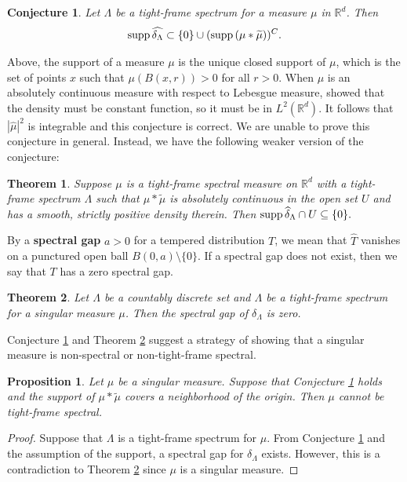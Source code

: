 \documentclass[12pt,a4paper,oneside]{amsart}
\newtheorem{theorem}{Theorem}
\newtheorem{conjecture}{Conjecture}
\newtheorem{proposition}{Proposition}
\theoremstyle{definition}
\newcommand{\Set}[1]{{\left\{{#1}\right\}}}
\newcommand{\RR}{{\mathbb R}}
\newcommand{\supp}{{\rm supp\,}}
\newcommand{\ft}[1]{\widehat{#1}}
\newcommand{\wt}[1]{\widetilde{#1}}
\newcounter{rem}
\begin{document}
\begin{conjecture}\label{conjecture1}
Let $\Lambda$ be a {tight-frame} spectrum for a measure $\mu$ in $\RR^d$. Then 
$$
\supp\ft{\delta_{\Lambda}} \subset \{0\}\cup (\supp (\mu\ast\wt{\mu}))^C. 
$$
\end{conjecture}
{Above}, the support of a measure $\mu$ is the unique closed support of $\mu$, which is the set of points $x$ such that $\mu (B(x,r))>0$ for all $r>0$.  When $\mu$ is an absolutely continuous measure {with respect to Lebesgue measure, \cite{dutkay2014uniformity} showed that the density must be constant function, so it must be in  $L^2(\RR^d)$. It follows that} $|\ft{\mu}|^2$ is integrable and this conjecture is correct. We are unable to prove this conjecture in general. Instead, we have the following weaker version of the conjecture: 

\begin{theorem}\label{prop-non-spectral}
 Suppose $\mu$ is a {tight-frame} spectral measure on $\RR^d$ with a {tight-frame} spectrum $\Lambda$ {such that} $\mu*\wt\mu$ is absolutely continuous in the open set $U$ and has a smooth, strictly positive density therein.  Then $
\supp\ft\delta_\Lambda \cap U \subseteq \Set{0}.$    
\end{theorem}\label{lm:support}

{By a} {\bf spectral gap} $a>0$ for a tempered distribution $T$, we mean that $\ft{T}$ vanishes on a {punctured} open ball $B(0,a)\setminus \{0\}$. If a spectral gap does not exist, then we say that $T$ has a zero spectral gap.  

\begin{theorem}\label{prop-spectral-gap}
Let $\Lambda$ be a countably discrete set and $\Lambda$ {be} a {tight-frame} spectrum for {a} singular measure $\mu$. Then the spectral gap of $\delta_\Lambda $ is zero. 
\end{theorem}

 Conjecture \ref{conjecture1} and Theorem \ref{prop-spectral-gap} suggest a strategy of showing that a singular measure is non-spectral or non-tight-frame spectral. 
 
\begin{proposition}\label{prop-spectral-gap-1} Let $\mu$ be a singular measure. Suppose that Conjecture \ref{conjecture1} holds and  the support of $\mu\ast\wt\mu$ covers a neighborhood of the origin. Then $\mu$ cannot be tight-frame spectral.
\end{proposition}

 \begin{proof}
Suppose that $\Lambda$ is a tight-frame spectrum for $\mu$. From Conjecture \ref{conjecture1} and the assumption of the support, a spectral gap for $\delta_{\Lambda}$ exists. However, this is a contradiction to Theorem \ref{prop-spectral-gap} since $\mu$ is a singular measure.       
 \end{proof}
 
\end{document}
